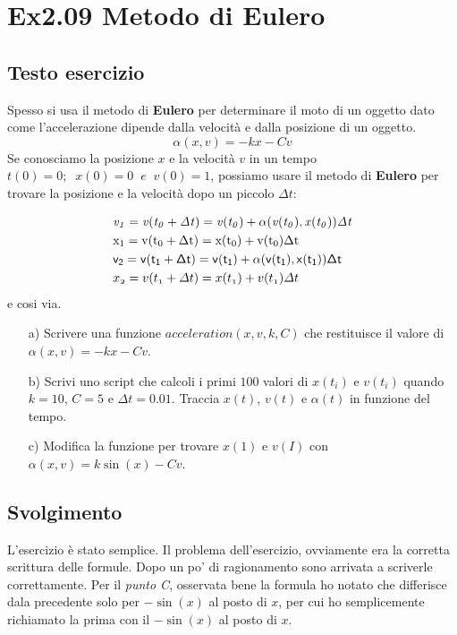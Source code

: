 \section{Ex2.09 Metodo di Eulero}\label{sec:Eulers_method}

\subsection{Testo esercizio}
Spesso si usa il metodo di \textbf{Eulero} per determinare il moto di un oggetto dato 
come l'accelerazione dipende dalla velocità e dalla posizione di un oggetto. 
$$\alpha(x,v) = \mathit{-kx-Cv}$$
Se conosciamo la posizione $\mathit{x}$ e la velocità $\mathit{v}$ in un tempo 
$\mathit{t(0)=0;\;\; x(0)=0\;\; e \;\;v(0)=1}$, possiamo usare il metodo di 
\textbf{Eulero} per trovare la posizione e la velocità dopo un piccolo $\Delta t:$

\begin{displaymath}
\begin{split}
&\mathit{v_1 = v(t_0 + \Delta t) = v(t_0) + \alpha(v(t_0),x(t_0))\Delta t} \\
&\mathrm{x_1 = v(t_0 + \Delta t) = x(t_0) + v(t_0)\Delta t} \\
&\mathsf{v_2 = v(t_1 + \Delta t) = v(t_1) + \alpha(v(t_1),x(t_1))\Delta t} \\
&\mathnormal{x_2 = v(t_1 + \Delta t) = x(t_1) + v(t_1)\Delta t} \\
\end{split}
\end{displaymath}
e cosi via.

\begin{itemize}
    \item[a)] Scrivere una funzione $\mathit{acceleration(x,v,k,C)}$ che restituisce 
    il valore di $\alpha(x,v) = -kx-Cv$.
    
    \item[b)] Scrivi uno script che calcoli i primi $100$ valori di $x(t_i)$ e $v(t_i)$ 
    quando $k=10$, $C=5$ e $\Delta t=0.01$. Traccia $x(t)$, $v(t)$ e $\alpha(t)$ in 
    funzione del tempo.
    
    \item[c)] Modifica la funzione per trovare $x(1)$ e $v(I)$ con    
    $\alpha(x,v)=k\sin(x)-Cv$.    
\end{itemize}

\subsection{Svolgimento}
L'esercizio è stato semplice. Il problema dell'esercizio, ovviamente era la corretta 
scrittura delle formule. Dopo un po' di ragionamento sono arrivata a scriverle 
correttamente. Per il \textit{punto C}, osservata bene la formula ho notato che 
differisce dala precedente solo per $-\sin(x)$ al posto di $x$, per cui ho semplicemente 
richiamato la prima con il $-\sin(x)$ al posto di $x$.

